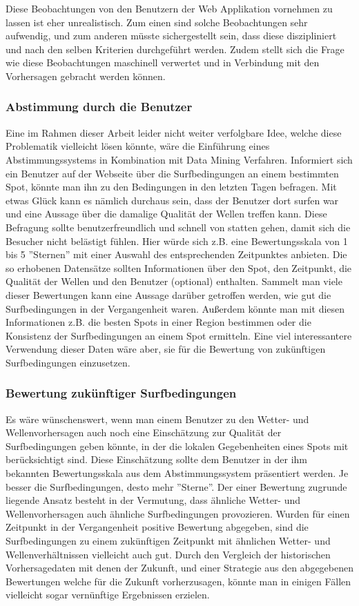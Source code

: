 Diese Beobachtungen von den Benutzern der Web Applikation vornehmen zu
lassen ist eher unrealistisch. Zum einen sind solche Beobachtungen
sehr aufwendig, und zum anderen müsste sichergestellt sein, dass diese
diszipliniert und nach den selben Kriterien durchgeführt werden. Zudem
stellt sich die Frage wie diese Beobachtungen maschinell verwertet und
in Verbindung mit den Vorhersagen gebracht werden können.

\subsubsection{Abstimmung durch die Benutzer}
Eine im Rahmen dieser Arbeit leider nicht weiter verfolgbare Idee,
welche diese Problematik vielleicht lösen könnte, wäre die Einführung
eines Abstimmungssystems in Kombination mit Data Mining
Verfahren. Informiert sich ein Benutzer auf der Webseite über die
Surfbedingungen an einem bestimmten Spot, könnte man ihn zu den
Bedingungen in den letzten Tagen befragen. Mit etwas Glück kann es
nämlich durchaus sein, dass der Benutzer dort surfen war und eine
Aussage über die damalige Qualität der Wellen treffen kann. Diese
Befragung sollte benutzerfreundlich und schnell von statten gehen,
damit sich die Besucher nicht belästigt fühlen. Hier würde sich
z.B. eine Bewertungsskala von 1 bis 5 ''Sternen'' mit einer Auswahl
des entsprechenden Zeitpunktes anbieten. Die so erhobenen Datensätze
sollten Informationen über den Spot, den Zeitpunkt, die Qualität der
Wellen und den Benutzer (optional) enthalten. Sammelt man viele dieser
Bewertungen kann eine Aussage darüber getroffen werden, wie gut die
Surfbedingungen in der Vergangenheit waren. Außerdem könnte man mit
diesen Informationen z.B. die besten Spots in einer Region bestimmen
oder die Konsistenz der Surfbedingungen an einem Spot ermitteln. Eine
viel interessantere Verwendung dieser Daten wäre aber, sie für die
Bewertung von zukünftigen Surfbedingungen einzusetzen.

\subsubsection{Bewertung zukünftiger Surfbedingungen}
Es wäre wünschenswert, wenn man einem Benutzer zu den Wetter- und
Wellenvorhersagen auch noch eine Einschätzung zur Qualität der
Surfbedingungen geben könnte, in der die lokalen Gegebenheiten eines
Spots mit berücksichtigt sind. Diese Einschätzung sollte dem Benutzer
in der ihm bekannten Bewertungsskala aus dem Abstimmungssystem
präsentiert werden. Je besser die Surfbedingungen, desto mehr
''Sterne''. Der einer Bewertung zugrunde liegende Ansatz besteht in
der Vermutung, dass ähnliche Wetter- und Wellenvorhersagen auch
ähnliche Surfbedingungen provozieren. Wurden für einen Zeitpunkt in
der Vergangenheit positive Bewertung abgegeben, sind die
Surfbedingungen zu einem zukünftigen Zeitpunkt mit ähnlichen Wetter-
und Wellenverhältnissen vielleicht auch gut. Durch den Vergleich der
historischen Vorhersagedaten mit denen der Zukunft, und einer
Strategie aus den abgegebenen Bewertungen welche für die Zukunft
vorherzusagen, könnte man in einigen Fällen vielleicht sogar
vernünftige Ergebnissen erzielen.

